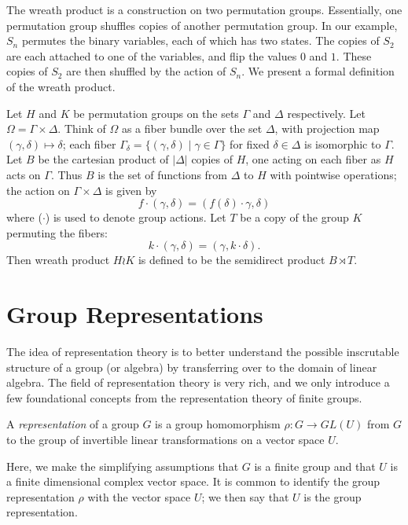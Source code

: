 \documentclass[cclicense]{hmcthesis}
\numberwithin{equation}{chapter}
\numberwithin{thmcounter}{chapter}
\begin{document}
    The wreath product is a construction on two permutation groups.
    Essentially, one permutation group shuffles copies of another permutation
    group.  In our example, $S_n$ permutes the binary variables, each of which
    has two states.  The copies of $S_2$ are each attached to one of the
    variables, and flip the values $0$ and $1$.  These copies of $S_2$ are then
    shuffled by the action of $S_n$.  We present a formal definition of the
    wreath product.
    \begin{definition}
        Let $H$ and $K$ be permutation groups on the sets $\Gamma$ and $\Delta$
        respectively.  Let $\Omega = \Gamma \times \Delta$.  Think of $\Omega$
        as a fiber bundle over the set $\Delta$, with projection map $(\gamma,
        \delta) \mapsto \delta$; each fiber \mbox{$\Gamma_\delta = \{(\gamma, \delta)
        \mid \gamma \in \Gamma\}$} for fixed $\delta \in \Delta$ is isomorphic to
        $\Gamma$.  Let $B$ be the cartesian product of $|\Delta|$ copies of $H$,
        one acting on each fiber as $H$ acts on $\Gamma$.  Thus $B$ is the set
        of functions from $\Delta$ to $H$ with pointwise operations; the action
        on $\Gamma \times \Delta$ is given by
        \[
            f\cdot(\gamma, \delta) = (f(\delta) \cdot \gamma, \delta)
        \]
        where ($\cdot$) is used to denote group actions.  Let $T$ be a copy of
        the group $K$ permuting the fibers:
        \[
            k \cdot (\gamma, \delta) = (\gamma, k \cdot \delta).
        \]
        Then wreath product $H \wr K$ is defined to be the semidirect product $B
        \rtimes T$.
    \end{definition}

\section{Group Representations}
    
    The idea of representation theory is to better understand the possible
    inscrutable structure of a group (or algebra) by transferring over to the
    domain of linear algebra.  The field of representation theory is very rich,
    and we only introduce a few foundational concepts from the representation
    theory of finite groups.

    \begin{definition}
        A \emph{representation} of a group $G$ is a group homomorphism $\rho: G
        \to GL(U)$ from $G$ to the group of invertible linear transformations on
        a vector space $U$.  
    \end{definition}
    Here, we make the simplifying assumptions that $G$ is a finite group and
    that $U$ is a finite dimensional complex vector space.  It is common to
    identify the group representation $\rho$ with the vector space $U$; we then
    say that $U$ is the group representation.
\end{document}
